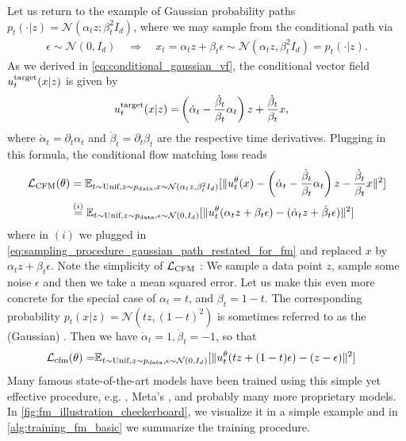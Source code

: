\begin{examplebox}
Let us return to the example of Gaussian probability paths $p_t(\cdot|z)=\mathcal{N}(\alpha_t z; \beta_t^2 I_d)$, where we may sample from the conditional path via
\begin{align}
\label{eq:sampling_procedure_gaussian_path_restated_for_fm}
    \epsilon\sim\mathcal{N}(0,I_d)\quad 
    \Rightarrow\quad x_t = \alpha_t z + \beta_t \epsilon \sim \mathcal{N}(\alpha_tz,\beta_t^2I_d)=p_t(\cdot|z).
\end{align}
As we derived in \cref{eq:conditional_gaussian_vf}, the conditional vector field $u^{\text{target}}_t(x|z)$ is given by
\begin{align}
\label{e:marginal_vf_cond_score}
    u^{\text{target}}_t(x|z) =& \left(\dot{\alpha}_t-\frac{\dot{\beta}_t}{\beta_t}\alpha_t\right)z+\frac{\dot{\beta}_t}{\beta_t}x,
\end{align}
where $\dot{\alpha}_t=\partial_t\alpha_t$ and $\dot{\beta}_t=\partial_t\beta_t$ are the respective time derivatives. Plugging in this formula, the conditional flow matching loss reads
\begin{align}
\mathcal{L}_{\text{CFM}}(\theta) &= \mathbb{E}_{t\sim \text{Unif},z\sim p_{\rm{data}}, x\sim \mathcal{N}(\alpha_tz,\beta_t^2I_d)}[\lVert u_t^\theta(x)-\left(\dot{\alpha}_t-\frac{\dot{\beta}_t}{\beta_t}\alpha_t\right)z-\frac{\dot{\beta}_t}{\beta_t}x\rVert^2]\\&\overset{(i)}{=}\mathbb{E}_{t\sim\text{Unif},z\sim p_{\rm{data}}, \epsilon\sim \mathcal{N}(0,I_d)}[\|u_t^\theta(\alpha_tz+\beta_t\epsilon)-(\dot{\alpha}_tz+\dot{\beta}_t\epsilon)\|^2]
\end{align}
where in $(i)$ we plugged in \cref{eq:sampling_procedure_gaussian_path_restated_for_fm} and replaced $x$ by $\alpha_tz+\beta_t\epsilon$. Note the simplicity of $\mathcal{L}_{\text{CFM}}$ : We sample a data point $z$, sample some noise $\epsilon$ and then we take a mean squared error. Let us make this even more concrete for the special case of $\alpha_t=t$, and $\beta_t=1-t$. The corresponding probability $p_t(x|z)=\mathcal{N}(tz,(1-t)^2)$ is sometimes referred to as the (Gaussian) . Then we have $\dot{\alpha}_t=1,\dot{\beta}_t=-1$, so that
\begin{align*}
        \mathcal{L}_{\text{cfm}}(\theta)=&\mathbb{E}_{t\sim\text{Unif},z\sim p_{\rm{data}}, \epsilon\sim \mathcal{N}(0,I_d)}[\|u_t^\theta(tz+(1-t)\epsilon)-(z-\epsilon)\|^2]
\end{align*}
Many famous state-of-the-art models have been trained using this simple yet effective procedure, e.g. , Meta's , and probably many more proprietary models. In \cref{fig:fm_illustration_checkerboard}, we visualize it in a simple example and in \cref{alg:training_fm_basic} we summarize the training procedure.
\end{examplebox}

